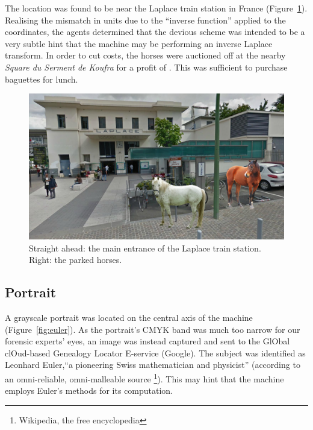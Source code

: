 The location was found to be near the Laplace train station in France (Figure~\ref{fig:laplace-horses}). Realising the mismatch in units due to the ``inverse function'' applied to the coordinates, the agents determined that the devious scheme was intended to be a very subtle hint that the machine may be performing an inverse Laplace transform. In order to cut costs, the horses were auctioned off at the nearby \emph{Square du Serment de Koufra} for a profit of . This was sufficient to purchase baguettes for lunch.

\begin{figure}[h]
	\centering
	\includegraphics[width=0.95\columnwidth]{img/laplace-horses.jpg}
	\caption{Straight ahead: the main entrance of the Laplace train station. Right: the parked horses.}
	\label{fig:laplace-horses}
\end{figure}



\subsection{Portrait}
\newcommand{\google}{\textcolor{google-blue}{G}\textcolor{google-red}{o}\textcolor{google-yellow}{o}\textcolor{google-blue}{g}\textcolor{google-green}{l}\textcolor{google-red}{e}}

A grayscale portrait was located on the central axis of the machine (Figure~\ref{fig:euler}). As the portrait's CMYK band was much too narrow for our forensic experts' eyes, an image was instead captured and sent to the \textcolor{google-blue}{G}l\textcolor{google-red}{O}bal cl\textcolor{google-yellow}{O}ud-based \textcolor{google-blue}{G}enealogy \textcolor{google-green}{L}ocator \textcolor{google-red}{E}-service (\google). The subject was identified as Leonhard Euler,``a pioneering Swiss mathematician and physicist'' (according to an omni-reliable, omni-malleable source \footnote{Wikipedia, the free encyclopedia}). This may hint that the machine employs Euler's methods for its computation.


